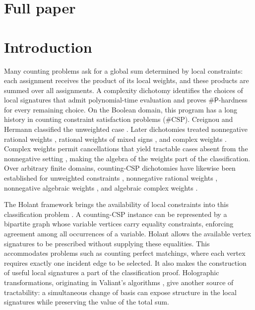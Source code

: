 \documentclass[11pt,letterpaper,onecolumn]{article}
\theoremstyle{plain}
\theoremstyle{definition}
\theoremstyle{remark}
\newcommand{\SharpP}{\#\mathsf P}
\begin{document}
\section*{Full paper}

\section{Introduction}
\label{sec:p1-introduction}

Many counting problems ask for a global sum determined by local
constraints: each assignment receives the product of its local weights,
and these products are summed over all assignments.  A complexity
dichotomy identifies the choices of local signatures that admit
polynomial-time evaluation and proves \(\SharpP\)-hardness for every
remaining choice.  On the Boolean domain, this program has a long history
in counting constraint satisfaction problems (\(\#\mathrm{CSP}\)).
Creignou and Hermann classified the unweighted case
\cite{CreignouHermann1996}.  Later dichotomies treated nonnegative rational
weights \cite{DyerGoldbergJerrum2009}, rational weights of mixed signs
\cite{BulatovDyerGoldbergJalseniusRicherby2009}, and complex weights
\cite{CaiLuXia2014}.  Complex weights permit cancellations that yield
tractable cases absent from the nonnegative setting
\cite{CaiLuXia2014}, making the algebra of the weights part of the
classification.
Over arbitrary finite domains, counting-CSP dichotomies have likewise
been established for unweighted constraints
\cite{Bulatov2013,DyerRicherby2013}, nonnegative rational weights
\cite{BulatovDyerGoldbergJalseniusJerrumRicherby2012}, nonnegative algebraic
weights \cite{CaiChenLu2016}, and algebraic complex weights
\cite{CaiChen2017}.

The Holant framework brings the availability of local constraints into
this classification problem \cite{CaiLuXia2009}.  A counting-CSP instance
can be represented by a bipartite graph whose variable vertices carry
equality constraints, enforcing agreement among all occurrences of a
variable.  Holant allows the available vertex signatures to be prescribed
without supplying these equalities.  This accommodates problems such as
counting perfect matchings, where each vertex requires exactly one
incident edge to be selected.  It also makes the construction of useful
local signatures a part of the classification proof.  Holographic
transformations, originating in Valiant's algorithms \cite{Valiant2008},
give another source of tractability: a simultaneous change of basis can
expose structure in the local signatures while preserving the value of the
total sum.
\end{document}
